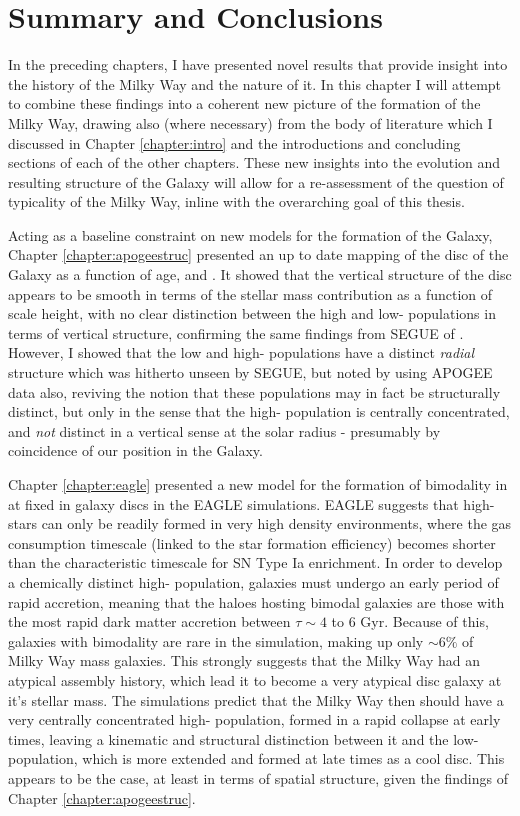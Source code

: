 \chapter{Summary and Conclusions}
\label{chapter:conclusions}
In the preceding chapters, I have presented novel results that provide insight into the history of the Milky Way and the nature of it. In this chapter I will attempt to combine these findings into a coherent new picture of the formation of the Milky Way, drawing also (where necessary) from the body of literature which I discussed in Chapter \ref{chapter:intro} and the introductions and concluding sections of each of the other chapters. These new insights into the evolution and resulting structure of the Galaxy will allow for a re-assessment of the question of typicality of the Milky Way, inline with the overarching goal of this thesis. 

Acting as a baseline constraint on new models for the formation of the Galaxy, Chapter \ref{chapter:apogeestruc} presented an up to date mapping of the disc of the Galaxy as a function of age, \feh{} and \afe{}. It showed that the vertical structure of the disc appears to be smooth in terms of the stellar mass contribution as a function of scale height, with no clear distinction between the high and low-\afe{} populations in terms of vertical structure, confirming the same findings from SEGUE of \citet{2012ApJ...751..131B}. However, I showed that the low and high-\afe{} populations have a distinct \emph{radial} structure which was hitherto unseen by SEGUE, but noted by \citet{2016ApJ...823...30B} using APOGEE data also, reviving the notion that these populations may in fact be structurally distinct, but only in the sense that the high-\afe{} population is centrally concentrated, and \emph{not} distinct in a vertical sense at the solar radius - presumably by coincidence of our position in the Galaxy. 

Chapter \ref{chapter:eagle} presented a new model for the formation of bimodality in \afe{} at fixed \feh{} in galaxy discs in the EAGLE simulations. EAGLE suggests that high-\afe{} stars can only be readily formed in very high density environments, where the gas consumption timescale (linked to the star formation efficiency) becomes shorter than the characteristic timescale for SN Type Ia enrichment. In order to develop a chemically distinct high-\afe{} population, galaxies must undergo an early period of rapid accretion, meaning that the haloes hosting bimodal galaxies are those with the most rapid dark matter accretion between $\tau \sim 4$ to $6$ Gyr. Because of this, galaxies with \afe{} bimodality are rare in the simulation, making up only $\sim 6\%$ of Milky Way mass galaxies. This strongly suggests that the Milky Way had an atypical assembly history, which lead it to become a very atypical disc galaxy at it's stellar mass. The simulations predict that the Milky Way then should have a very centrally concentrated high-\afe{} population, formed in a rapid collapse at early times, leaving a kinematic and structural distinction between it and the low-\afe{} population, which is more extended and formed at late times as a cool disc. This appears to be the case, at least in terms of spatial structure, given the findings of Chapter \ref{chapter:apogeestruc}.


